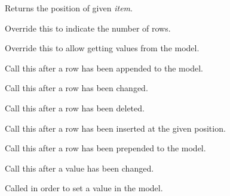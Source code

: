 Returns the position of given {\it item}.

\label{wxdataviewindexlistmodelgetrowcount}


Override this to indicate the number of rows.

\label{wxdataviewindexlistmodelgetvalue}


Override this to allow getting values from the model.

\label{wxdataviewindexlistmodelrowappended}


Call this after a row has been appended to the model.

\label{wxdataviewindexlistmodelrowchanged}


Call this after a row has been changed.

\label{wxdataviewindexlistmodelrowdeleted}


Call this after a row has been deleted.

\label{wxdataviewindexlistmodelrowinserted}


Call this after a row has been inserted at the given position.

\label{wxdataviewindexlistmodelrowprepended}


Call this after a row has been prepended to the model.

\label{wxdataviewindexlistmodelrowvaluechanged}


Call this after a value has been changed.

\label{wxdataviewindexlistmodelsetvalue}


Called in order to set a value in the model.